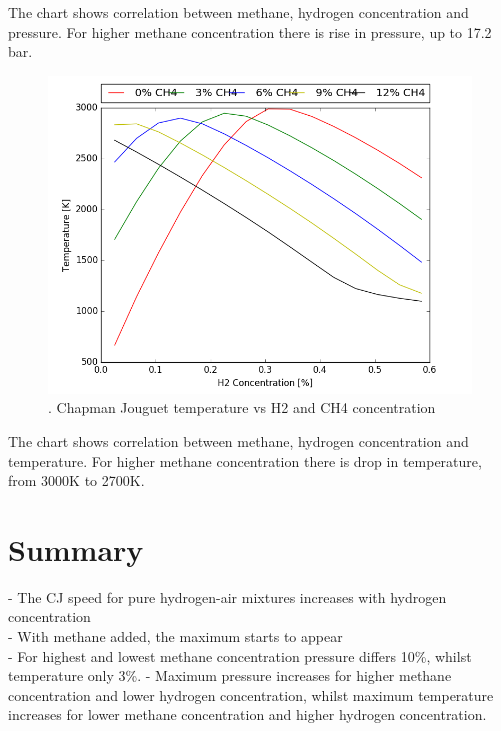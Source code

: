 \documentclass[11pt,a4paper]{article}
\begin{document}
The chart shows correlation between methane, hydrogen concentration and pressure. For higher methane concentration there is rise in pressure, up to 17.2 bar.
\clearpage
\begin{figure}[t]
    \centering
    \includegraphics[width=1.2\textwidth]{plot_T}
    \caption{.        Chapman Jouguet temperature vs H2 and CH4 concentration}
    \label{fig:T}
\end{figure}

The chart shows correlation between methane, hydrogen concentration and temperature. For higher methane concentration there is drop in temperature, from 3000K to 2700K.



\section{Summary}\label{sec:summary}
- The CJ speed for pure hydrogen-air mixtures increases with hydrogen concentration\\
- With methane added, the maximum starts to appear\\
- For highest and lowest methane concentration pressure differs 10\%, whilst temperature only 3\%.
- Maximum pressure increases for higher methane concentration and lower hydrogen concentration, whilst maximum temperature increases for lower methane concentration and higher hydrogen concentration.
\end{document}
